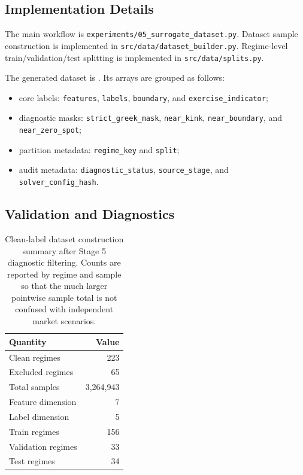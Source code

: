 \documentclass[11pt]{article}
\begin{document}
\subsection{Implementation Details}
The main workflow is \texttt{experiments/05\_surrogate\_dataset.py}. Dataset sample construction is implemented in \texttt{src/data/dataset\_builder.py}. Regime-level train/validation/test splitting is implemented in \texttt{src/data/splits.py}.

The generated dataset is . Its arrays
are grouped as follows:
\begin{itemize}
  \item core labels: \texttt{features}, \texttt{labels}, \texttt{boundary},
    and \texttt{exercise\_indicator};
  \item diagnostic masks: \texttt{strict\_greek\_mask}, \texttt{near\_kink},
    \texttt{near\_boundary}, and \texttt{near\_zero\_spot};
  \item partition metadata: \texttt{regime\_key} and \texttt{split};
  \item audit metadata: \texttt{diagnostic\_status}, \texttt{source\_stage},
    and \texttt{solver\_config\_hash}.
\end{itemize}

\subsection{Validation and Diagnostics}
\begin{table}[h]
\centering
\begin{tabular}{lr}
\toprule
Quantity & Value\\
\midrule
Clean regimes & 223\\
Excluded regimes & 65\\
Total samples & 3,264,943\\
Feature dimension & 7\\
Label dimension & 5\\
Train regimes & 156\\
Validation regimes & 33\\
Test regimes & 34\\
\bottomrule
\end{tabular}
\caption{Clean-label dataset construction summary after Stage 5 diagnostic filtering. Counts are reported by regime and sample so that the much larger pointwise sample total is not confused with independent market scenarios.}
\end{table}
\end{document}
